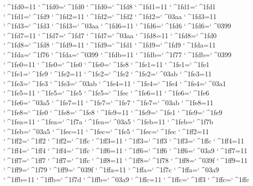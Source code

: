\catcode`^^^^1fd0=11 \lccode`^^^^1fd0=`^^^^1fd0 \uccode`^^^^1fd0=`^^^^1fd8 
\catcode`^^^^1fd1=11 \lccode`^^^^1fd1=`^^^^1fd1 \uccode`^^^^1fd1=`^^^^1fd9 
\catcode`^^^^1fd2=11 \lccode`^^^^1fd2=`^^^^1fd2 \uccode`^^^^1fd2=`^^^^03aa 
\catcode`^^^^1fd3=11 \lccode`^^^^1fd3=`^^^^1fd3 \uccode`^^^^1fd3=`^^^^03aa 
\catcode`^^^^1fd6=11 \lccode`^^^^1fd6=`^^^^1fd6 \uccode`^^^^1fd6=`^^^^0399 
\catcode`^^^^1fd7=11 \lccode`^^^^1fd7=`^^^^1fd7 \uccode`^^^^1fd7=`^^^^03aa 
\catcode`^^^^1fd8=11 \lccode`^^^^1fd8=`^^^^1fd0 \uccode`^^^^1fd8=`^^^^1fd8 
\catcode`^^^^1fd9=11 \lccode`^^^^1fd9=`^^^^1fd1 \uccode`^^^^1fd9=`^^^^1fd9 
\catcode`^^^^1fda=11 \lccode`^^^^1fda=`^^^^1f76 \uccode`^^^^1fda=`^^^^0399 
\catcode`^^^^1fdb=11 \lccode`^^^^1fdb=`^^^^1f77 \uccode`^^^^1fdb=`^^^^0399 
\catcode`^^^^1fe0=11 \lccode`^^^^1fe0=`^^^^1fe0 \uccode`^^^^1fe0=`^^^^1fe8 
\catcode`^^^^1fe1=11 \lccode`^^^^1fe1=`^^^^1fe1 \uccode`^^^^1fe1=`^^^^1fe9 
\catcode`^^^^1fe2=11 \lccode`^^^^1fe2=`^^^^1fe2 \uccode`^^^^1fe2=`^^^^03ab 
\catcode`^^^^1fe3=11 \lccode`^^^^1fe3=`^^^^1fe3 \uccode`^^^^1fe3=`^^^^03ab 
\catcode`^^^^1fe4=11 \lccode`^^^^1fe4=`^^^^1fe4 \uccode`^^^^1fe4=`^^^^03a1 
\catcode`^^^^1fe5=11 \lccode`^^^^1fe5=`^^^^1fe5 \uccode`^^^^1fe5=`^^^^1fec 
\catcode`^^^^1fe6=11 \lccode`^^^^1fe6=`^^^^1fe6 \uccode`^^^^1fe6=`^^^^03a5 
\catcode`^^^^1fe7=11 \lccode`^^^^1fe7=`^^^^1fe7 \uccode`^^^^1fe7=`^^^^03ab 
\catcode`^^^^1fe8=11 \lccode`^^^^1fe8=`^^^^1fe0 \uccode`^^^^1fe8=`^^^^1fe8 
\catcode`^^^^1fe9=11 \lccode`^^^^1fe9=`^^^^1fe1 \uccode`^^^^1fe9=`^^^^1fe9 
\catcode`^^^^1fea=11 \lccode`^^^^1fea=`^^^^1f7a \uccode`^^^^1fea=`^^^^03a5 
\catcode`^^^^1feb=11 \lccode`^^^^1feb=`^^^^1f7b \uccode`^^^^1feb=`^^^^03a5 
\catcode`^^^^1fec=11 \lccode`^^^^1fec=`^^^^1fe5 \uccode`^^^^1fec=`^^^^1fec 
\catcode`^^^^1ff2=11 \lccode`^^^^1ff2=`^^^^1ff2 \uccode`^^^^1ff2=`^^^^1ffc 
\catcode`^^^^1ff3=11 \lccode`^^^^1ff3=`^^^^1ff3 \uccode`^^^^1ff3=`^^^^1ffc 
\catcode`^^^^1ff4=11 \lccode`^^^^1ff4=`^^^^1ff4 \uccode`^^^^1ff4=`^^^^1ffc 
\catcode`^^^^1ff6=11 \lccode`^^^^1ff6=`^^^^1ff6 \uccode`^^^^1ff6=`^^^^03a9 
\catcode`^^^^1ff7=11 \lccode`^^^^1ff7=`^^^^1ff7 \uccode`^^^^1ff7=`^^^^1ffc 
\catcode`^^^^1ff8=11 \lccode`^^^^1ff8=`^^^^1f78 \uccode`^^^^1ff8=`^^^^039f 
\catcode`^^^^1ff9=11 \lccode`^^^^1ff9=`^^^^1f79 \uccode`^^^^1ff9=`^^^^039f 
\catcode`^^^^1ffa=11 \lccode`^^^^1ffa=`^^^^1f7c \uccode`^^^^1ffa=`^^^^03a9 
\catcode`^^^^1ffb=11 \lccode`^^^^1ffb=`^^^^1f7d \uccode`^^^^1ffb=`^^^^03a9 
\catcode`^^^^1ffc=11 \lccode`^^^^1ffc=`^^^^1ff3 \uccode`^^^^1ffc=`^^^^1ffc
\endinput 
